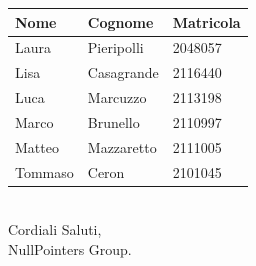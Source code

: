 \documentclass{article}
\begin{document}
	\begin{tabular}{|p{}|p{}|p{}|}
		\hline
		\rowcolor{red!10!blue!20}
		\textbf{Nome} & \textbf{Cognome} & \textbf{Matricola} \\
		\hline
		Laura & Pieripolli & 2048057 \\ \hline
		Lisa & Casagrande & 2116440 \\ \hline
		Luca & Marcuzzo & 2113198 \\ \hline
		Marco & Brunello & 2110997 \\ \hline
		Matteo & Mazzaretto & 2111005 \\\hline
		Tommaso & Ceron & 2101045 \\ \hline
	\end{tabular} \\
	
	\vskip 0.2in
	Cordiali Saluti, \\
	NullPointers Group.
\end{document}
